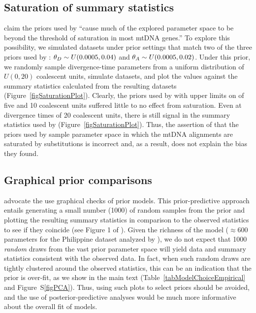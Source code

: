 \subsection{Saturation of summary statistics}
\citet{Hickerson2013} claim the priors used by \citet{Oaks2012} ``cause much of
the explored parameter space to be beyond the threshold of saturation in most
mtDNA genes.'' To explore this possibility, we simulated datasets under prior
settings that match two of the three priors used by \citet{Oaks2012}:
$\meanDescendantTheta{} \sim U(0.0005, 0.04)$ and $\ancestralTheta{} \sim
U(0.0005, 0.02)$.
Under this prior, we randomly sample divergence-time parameters from a uniform
distribution of $U(0, 20)$ coalescent units, simulate datasets, and plot the
\divt{} values against the summary statistics calculated from the resulting
datasets (Figure~\ref{figSaturationPlot}).
Clearly, the priors used by \citet{Oaks2012} with upper limits on \divt{} of five
and 10 coalescent units suffered little to no effect from saturation.
Even at divergence times of 20 coalescent units, there is still signal in the
summary statistics used by \msb (Figure~\ref{figSaturationPlot}).
Thus, the assertion of \citet{Hickerson2013} that the priors used by
\citet{Oaks2012} sample parameter space in which the mtDNA alignments are
saturated by substitutions is incorrect and, as a result, does not explain the
bias they found.

\subsection{Graphical prior comparisons}
\citet{Hickerson2013} advocate the use graphical checks of prior models.
This prior-predictive approach entails generating a small number (1000) of
random samples from the prior and plotting the resulting summary statistics in
comparison to the observed statistics to see if they coincide (see Figure 1 of
\citet{Hickerson2013}).
Given the richness of the \msb model ($\approx 600$ parameters for the Philippine
dataset analyzed by \citet{Hickerson2013}), we do not expect that 1000
\emph{random} draws from the vast prior parameter space will yield data and
summary statistics consistent with the observed data.
In fact, when such random draws are tightly clustered around the observed
statistics, this can be an indication that the prior is over-fit, as we show in
the main text (Table~\ref{tabModelChoiceEmpirical} and Figure~S\ref{figPCA}).
Thus, using such plots to select priors should be avoided, and the use of
posterior-predictive analyses would be much more informative about the overall
fit of models.

